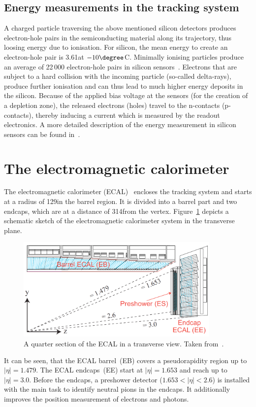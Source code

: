 \subsection*{Energy measurements in the tracking system}
A charged particle traversing the above mentioned silicon detectors produces electron-hole pairs in the semiconducting material along its trajectory, thus loosing energy due to ionisation.
For silicon, the mean energy to create an electron-hole pair is 3.61\ev at $-10\degree$C.
Minimally ionising particles produce an average of 22\,000 electron-hole pairs in silicon sensors~\cite{Thesis_Jenny}.
Electrons that are subject to a hard collision with the incoming particle (so-called delta-rays), produce further ionisation and can thus lead to much higher energy deposits in the silicon.
Because of the applied bias voltage at the sensors (for the creation of a depletion zone), the released electrons (holes) travel to the n-contacts (p-contacts), thereby inducing a current which is measured by the readout electronics. 
A more detailed description of the energy measurement in silicon sensors can be found in~\cite{Thesis_Jenny}.

\section{The electromagnetic calorimeter}
The electromagnetic calorimeter (ECAL)~\cite{bib:CMS:TDR_2006,bib:CMS:TDR_ECAL} encloses the tracking system and starts at a radius of 129\cm in the barrel region.
It is divided into a barrel part and two endcaps, which are at a distance of 314\cm from the vertex.
Figure~\ref{fig:ECAL} depicts a schematic sketch of the electromagnetic calorimeter system in the transverse plane.
\begin{figure}[!h]
  \centering
      \includegraphics[width=0.89\textwidth]{figures/experiment/CMS/Figures_Experimental_Apparatus_ECALRapidity.png}
  \caption{A quarter section of the ECAL in a transverse view. Taken from~\cite{bib:CMS:TDR_2006}.}  
  \label{fig:ECAL}
\end{figure}
It can be seen, that the ECAL barrel~(EB) covers a pseudorapidity region up to $|\eta|=1.479$.
The ECAL endcaps~(EE) start at $|\eta|=1.653$ and reach up to $|\eta|=3.0$.
Before the endcaps, a preshower detector ($1.653<|\eta|<2.6$) is installed with the main task to identify neutral pions in the endcaps.
It additionally improves the position measurement of electrons and photons.

